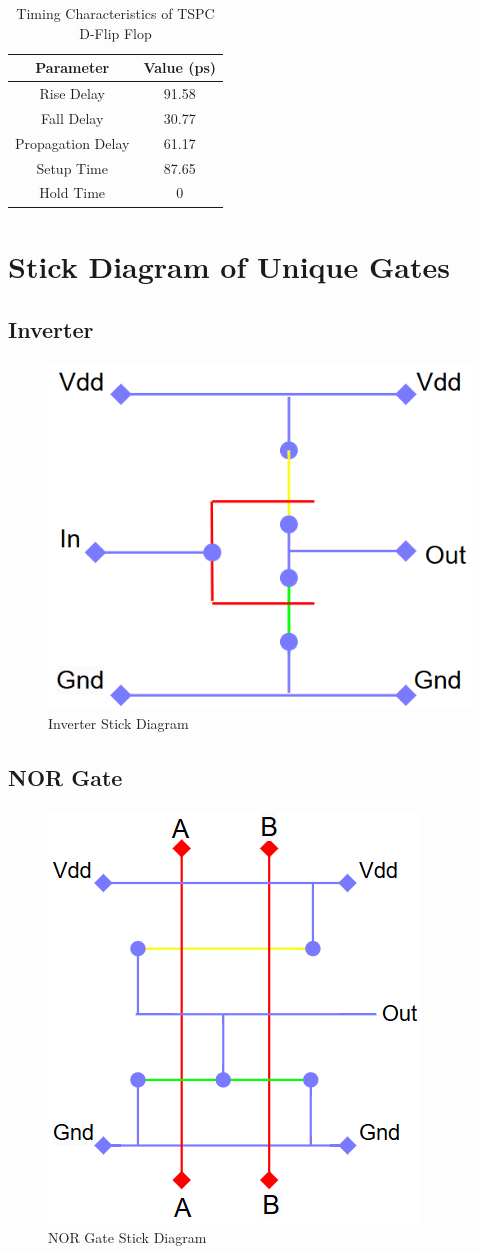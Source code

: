 \documentclass[conference]{IEEEtran}
\begin{document}
\begin{table}[H]
    \centering
    \caption{Timing Characteristics of TSPC D-Flip Flop}
    \begin{tabular}{|c|c|}
    \hline
    \rowcolor{cyan!10}
    \textbf{Parameter} & \textbf{Value (ps)} \\ \hline
    Rise Delay & 91.58 \\ \hline
    Fall Delay & 30.77 \\ \hline
    Propagation Delay & 61.17 \\ \hline
    Setup Time & 87.65  \\ \hline
    Hold Time & 0 \\ \hline
    \end{tabular}
    \label{tab:dff_timing}
    \end{table}

\section{Stick Diagram of Unique Gates}

\subsection{Inverter}
\begin{figure}[H]
    \centering
    \includegraphics[width=0.5\linewidth]{stickinv.png}
    \caption{Inverter Stick Diagram}
    \label{fig:inverter}
\end{figure}

\subsection{NOR Gate}
\begin{figure}[H]
    \centering
    \includegraphics[width=0.5\linewidth]{sticknor.png}
    \caption{NOR Gate Stick Diagram}
    \label{fig:nor}
\end{figure}
\end{document}
